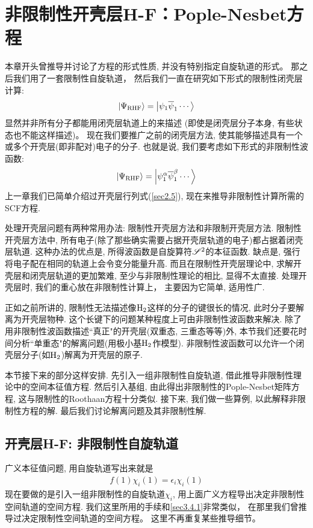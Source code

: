 \section{非限制性开壳层H-F：Pople-Nesbet方程}
本章开头曾推导并讨论了\hft 方程的形式性质, 
并没有特别指定自旋轨道的形式。 
那之后我们用了一套限制性自旋轨道， 
然后我们一直在研究如下形式的限制性闭壳层计算:
\begin{align}
	\Ket{\Psi_\mathrm{RHF}} = \Ket{\psi_1\overline{\psi}_1\cdots}
\end{align}
显然并非所有分子都能用闭壳层轨道上的来描述
(即使是闭壳层分子本身, 有些状态也不能这样描述)。
现在我们要推广之前的闭壳层方法, 
使其能够描述具有一个或多个开壳层(即非配对)电子的分子. 
也就是说, 
我们要考虑如下形式的非限制性波函数:
\begin{align}
	\Ket{\Psi_\mathrm{RHF}} = \Ket{\psi_1^\alpha\overline{\psi}_1^\beta\cdots}
\end{align}
上一章我们已简单介绍过开壳层行列式(\autoref{sec2.5}), 
现在来推导非限制性计算所需的SCF方程.


处理开壳层问题有两种常用办法: 限制性开壳层\hft 方法和非限制开壳层\hft 方法. 
限制性开壳层方法中, 
所有电子(除了那些确实需要占据开壳层轨道的电子)都占据着闭壳层轨道. 
这种办法的优点是, 
所得波函数是自旋算符$\mathscr{S}^2$的本征函数. 
缺点是, 
强行将电子配在相同的轨道上会令变分能量升高. 
而且在限制性开壳层\hft 理论中, 
求解开壳层和闭壳层轨道的更加繁难, 
至少与非限制性\hft 理论的相比, 
显得不太直接. 
处理开壳层时, 
我们的重心放在非限制性计算上， 
主要因为它简单, 
适用性广.


正如之前所讲的, 
限制性\hft  无法描述像$\mathrm{H}_2$这样的分子的键很长的情况, 
此时分子要解离为开壳层物种. 
这个长键下的问题某种程度上可由非限制性波函数来解决. 
除了用非限制性波函数描述``真正"的开壳层(双重态, 
三重态等等)外, 
本节我们还要花时间分析``单重态"的解离问题(用极小基$\mathrm{H}_2$作模型). 
非限制性波函数可以允许一个闭壳层分子(如$\mathrm{H}_2$)解离为开壳层的原子.


本节接下来的部分这样安排. 
先引入一组非限制性自旋轨道, 
借此推导非限制性\hft 理论中的空间本征值方程. 
然后引入基组, 
由此得出非限制性的Pople-Nesbet矩阵方程, 
这与限制性的Roothaan方程十分类似. 
接下来, 
我们做一些算例, 
以此解释非限制性方程的解. 
最后我们讨论解离问题及其非限制性解.

\subsection{开壳层H-F: 非限制性自旋轨道}
广义\hft 本征值问题, 
用自旋轨道写出来就是
\begin{align}\label{3.308}
	f(1)\chi_i(1) = \epsilon_i \chi_i(1)
\end{align}
现在要做的是引入一组非限制性的自旋轨道$\chi_i$, 
用上面广义\hft 方程导出决定非限制性空间轨道的空间方程. 
我们这里所用的手续和\autoref{sec3.4.1}非常类似，
在那里我们曾推导过决定限制性空间轨道的空间方程。
这里不再重复某些推导细节。


